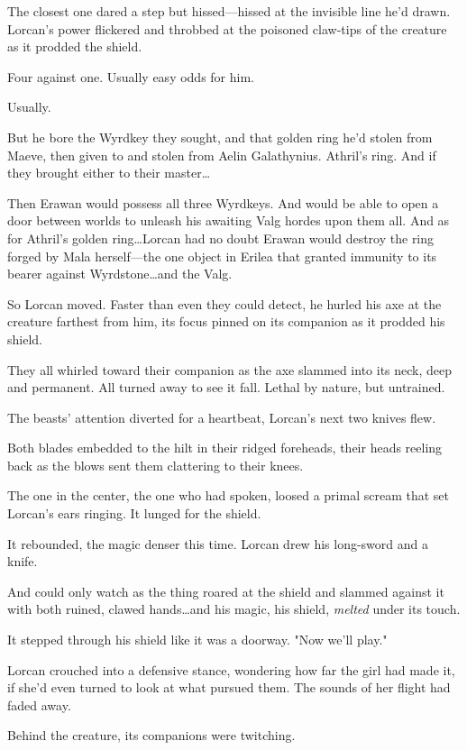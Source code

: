 The closest one dared a step but hissed---hissed at the invisible line he'd drawn.
Lorcan's power flickered and throbbed at the poisoned claw-tips of the creature as it prodded the shield.

Four against one.
Usually easy odds for him.

Usually.

But he bore the Wyrdkey they sought, and that golden ring he'd stolen from Maeve, then given to and stolen from Aelin Galathynius.
Athril's ring.
And if they brought either to their master\ldots{}

Then Erawan would possess all three Wyrdkeys.
And would be able to open a door between worlds to unleash his awaiting Valg hordes upon them all.
And as for Athril's golden ring\ldots Lorcan had no doubt Erawan would destroy the ring forged by Mala herself---the one object in Erilea that granted immunity to its bearer against Wyrdstone\ldots and the Valg.

So Lorcan moved.
Faster than even they could detect, he hurled his axe at the creature farthest from him, its focus pinned on its companion as it prodded his shield.

They all whirled toward their companion as the axe slammed into its neck, deep and permanent.
All turned away to see it fall.
Lethal by nature, but untrained.

The beasts' attention diverted for a heartbeat, Lorcan's next two knives flew.

Both blades embedded to the hilt in their ridged foreheads, their heads reeling back as the blows sent them clattering to their knees.

The one in the center, the one who had spoken, loosed a primal scream that set Lorcan's ears ringing.
It lunged for the shield.

It rebounded, the magic denser this time.
Lorcan drew his long-sword and a knife.

And could only watch as the thing roared at the shield and slammed against it with both ruined, clawed hands\ldots and his magic, his shield, \emph{melted} under its touch.

It stepped through his shield like it was a doorway.
"Now we'll play."

Lorcan crouched into a defensive stance, wondering how far the girl had made it, if she'd even turned to look at what pursued them.
The sounds of her flight had faded away.

Behind the creature, its companions were twitching.

